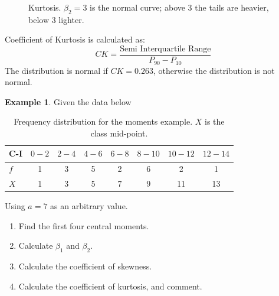 \documentclass[11pt,a4paper]{article}
\theoremstyle{definition}
\newtheorem{example}[thm]{Example}
\begin{document}
\begin{figure}[H]
\centering
{}
\caption{Kurtosis. $\beta_2=3$ is the normal curve; above 3 the tails are heavier, below 3 lighter.}
\end{figure}
 

















Coefficient of Kurtosis is calculated as:
\[CK=\frac{\text{Semi Interquartile Range}}{P_{90}-P_{10}}\]
The distribution is normal if $CK=0.263$, otherwise the distribution is not normal.

\begin{example}
Given the data below
\begin{table}[h!]
\centering
\begin{tabular}{|l|c|c|c|c|c|c|c|}
\hline
C-I & $0-2$ & $2-4$ & $4-6$ & $6-8$ & $8-10$ & $10-12$ & $12-14$\\
\hline
$f$ & 1 & 3 & 5 & 2 & 6 & 2 & 1\\
$X$ & 1 & 3 & 5 & 7 & 9 & 11 & 13\\
\hline
\end{tabular}
\caption{Frequency distribution for the moments example. $X$ is the class mid-point.}
\end{table}

Using $a=7$ as an arbitrary value.
\begin{enumerate}
\item Find the first four central moments.
\item Calculate $\beta_1$ and $\beta_2$.
\item Calculate the coefficient of skewness.
\item Calculate the coefficient of kurtosis, and comment.
\end{enumerate}
\end{example}
\end{document}
